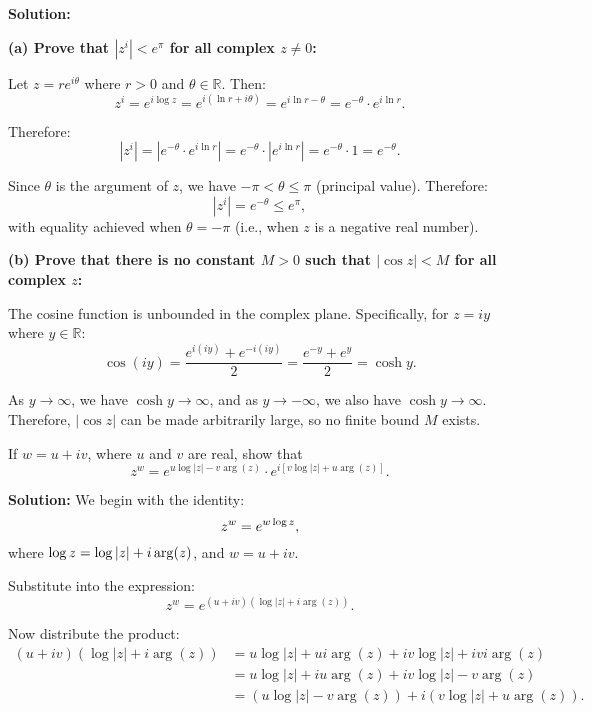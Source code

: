 \textbf{Solution:}

\textbf{(a) Prove that \( |z^i| < e^{\pi} \) for all complex \( z \ne 0 \):}

Let \( z = re^{i\theta} \) where \( r > 0 \) and \( \theta \in \mathbb{R} \). Then:
\[
z^i = e^{i \log z} = e^{i(\ln r + i\theta)} = e^{i\ln r - \theta} = e^{-\theta} \cdot e^{i\ln r}.
\]

Therefore:
\[
|z^i| = |e^{-\theta} \cdot e^{i\ln r}| = e^{-\theta} \cdot |e^{i\ln r}| = e^{-\theta} \cdot 1 = e^{-\theta}.
\]

Since \( \theta \) is the argument of \( z \), we have \( -\pi < \theta \leq \pi \) (principal value). Therefore:
\[
|z^i| = e^{-\theta} \leq e^{\pi},
\]
with equality achieved when \( \theta = -\pi \) (i.e., when \( z \) is a negative real number).

\textbf{(b) Prove that there is no constant \( M > 0 \) such that \( |\cos z| < M \) for all complex \( z \):}

The cosine function is unbounded in the complex plane. Specifically, for \( z = iy \) where \( y \in \mathbb{R} \):
\[
\cos(iy) = \frac{e^{i(iy)} + e^{-i(iy)}}{2} = \frac{e^{-y} + e^{y}}{2} = \cosh y.
\]

As \( y \to \infty \), we have \( \cosh y \to \infty \), and as \( y \to -\infty \), we also have \( \cosh y \to \infty \). Therefore, \( |\cos z| \) can be made arbitrarily large, so no finite bound \( M \) exists.

\begin{problembox}
If \( w = u + iv \), where \( u \) and \( v \) are real, show that
\[
z^w = e^{u \log |z| - v \arg(z)} \cdot e^{i[v \log |z| + u \arg(z)]}.
\]
\end{problembox}

\textbf{Solution:}  
We begin with the identity:
\[
z^w = e^{w \log z},
\]
where \( \log z = \log |z| + i \arg(z) \), and \( w = u + iv \).

Substitute into the expression:
\[
z^w = e^{(u + iv)(\log |z| + i \arg(z))}.
\]

Now distribute the product:
\begin{align*}
(u + iv)(\log |z| + i \arg(z)) 
&= u \log |z| + u i \arg(z) + iv \log |z| + iv i \arg(z) \\
&= u \log |z| + i u \arg(z) + i v \log |z| - v \arg(z) \\
&= (u \log |z| - v \arg(z)) + i (v \log |z| + u \arg(z)).
\end{align*}

